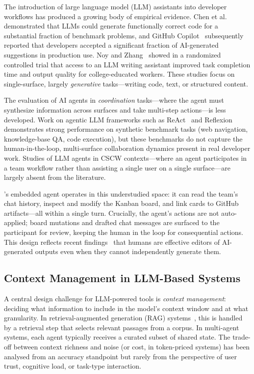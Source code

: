 The introduction of large language model (LLM) assistants into developer
workflows has produced a growing body of empirical evidence. Chen et
al.~\cite{chen2021codex} demonstrated that LLMs could generate functionally
correct code for a substantial fraction of benchmark problems, and GitHub
Copilot~\cite{copilot2022} subsequently reported that developers accepted a
significant fraction of AI-generated suggestions in production use. Noy and
Zhang~\cite{noy2023} showed in a randomized controlled trial that access to an
LLM writing assistant improved task completion time and output quality for
college-educated workers. These studies focus on single-surface, largely
\emph{generative} tasks---writing code, text, or structured content.

The evaluation of AI agents in \emph{coordination} tasks---where the agent must
synthesize information across surfaces and take multi-step actions---is less
developed. Work on agentic LLM frameworks such as ReAct~\cite{yao2023react} and
Reflexion~\cite{shinn2023reflexion} demonstrates strong performance on synthetic
benchmark tasks (web navigation, knowledge-base QA, code execution), but these
benchmarks do not capture the human-in-the-loop, multi-surface collaboration
dynamics present in real developer work. Studies of LLM agents in CSCW
contexts---where an agent participates in a team workflow rather than assisting a
single user on a single surface---are largely absent from the literature.

\Weld's embedded agent operates in this understudied space: it can read the
team's chat history, inspect and modify the Kanban board, and link cards to
GitHub artifacts---all within a single turn. Crucially, the agent's actions are
not auto-applied; board mutations and drafted chat messages are surfaced to the
participant for review, keeping the human in the loop for consequential actions.
This design reflects recent findings~\cite{noy2023} that humans are effective
editors of AI-generated outputs even when they cannot independently generate
them.

\subsection{Context Management in LLM-Based Systems}
\label{sec:related:context}

A central design challenge for LLM-powered tools is \emph{context management}:
deciding what information to include in the model's context window and at what
granularity. In retrieval-augmented generation (RAG) systems~\cite{lewis2020rag},
this is handled by a retrieval step that selects relevant passages from a corpus.
In multi-agent systems, each agent typically receives a curated subset of shared
state. The trade-off between context richness and noise (or cost, in
token-priced systems) has been analysed from an accuracy standpoint but rarely
from the perspective of user trust, cognitive load, or task-type interaction.

